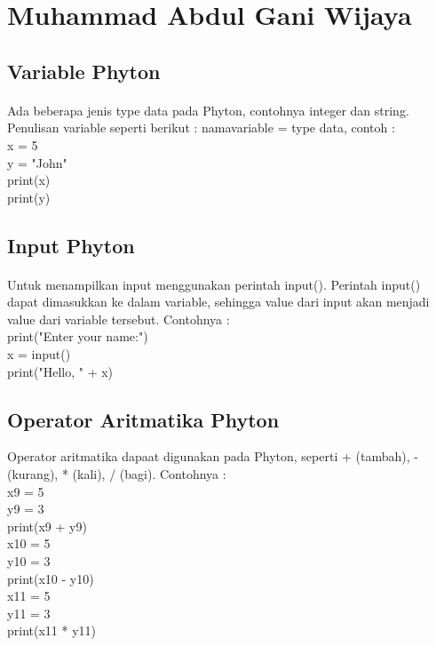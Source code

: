 \section{Muhammad Abdul Gani Wijaya}
\subsection{Variable Phyton}
\paragraph{}
Ada beberapa jenis type data pada Phyton, contohnya integer dan string. Penulisan variable seperti berikut :
namavariable = type data, contoh :\\
x = 5\\
y = "John"\\
print(x)\\
print(y)\\
\subsection{Input Phyton}
\paragraph{}
Untuk menampilkan input menggunakan perintah input(). Perintah input() dapat dimasukkan ke dalam variable, sehingga value dari input akan menjadi value dari variable tersebut. Contohnya : \\
print("Enter your name:")\\
x = input()\\
print("Hello, " + x)\\
\subsection{Operator Aritmatika Phyton}
Operator aritmatika dapaat digunakan pada Phyton, seperti + (tambah), - (kurang), * (kali), / (bagi). Contohnya : \\
x9 = 5\\
y9 = 3\\
print(x9 + y9)\\

x10 = 5\\
y10 = 3\\
print(x10 - y10)\\

x11 = 5\\
y11 = 3\\
print(x11 * y11)\\

